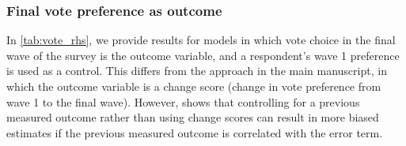 \documentclass[
  12pt,
]{article}
\begin{document}
\hypertarget{final-vote-preference-as-outcome}{%
\subsubsection{Final vote preference as outcome}\label{final-vote-preference-as-outcome}}

In \autoref{tab:vote_rhs}, we provide results for models in which vote choice in the final wave of the survey is the outcome variable, and a respondent's wave 1 preference is used as a control. This differs from the approach in the main manuscript, in which the outcome variable is a change score (change in vote preference from wave 1 to the final wave). However, \citet{Allison1990} shows that controlling for a previous measured outcome rather than using change scores can result in more biased estimates if the previous measured outcome is correlated with the error term.
\end{document}
